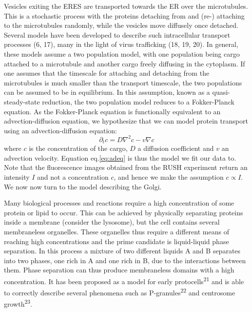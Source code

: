 \documentclass{Dissertate}
\begin{document}
Vesicles exiting the ERES are transported towards the ER over the
microtubules. This is a stochastic process with the proteins detaching
from and (re-) attaching to the microtubules randomly, while the
vesicles move diffusely once detached. Several models have been
developed to describe such intracellular transport processes (6, 17),
many in the light of virus trafficking (18, 19, 20). In general, these
models assume a two population model, with one population being cargo
attached to a microtubule and another cargo freely diffusing in the
cytoplasm. If one assumes that the timescale for attaching and detaching
from the microtubules is much smaller than the transport timescale, the
two populations can be assumed to be in equilibrium. In this assumption,
known as a quasi-steady-state reduction, the two population model
reduces to a Fokker-Planck equation. As the Fokker-Planck equation is
functionally equivalent to an advection-diffusion equation, we
hypothesize that we can model protein transport using an
advection-diffusion equation: \[
\partial_t c = D\nabla^2c-v\nabla c
\] where \(c\) is the concentration of the cargo, \(D\) a diffusion
coefficient and \(v\) an advection velocity. Equation eq.\ref{eq:adeq}
is thus the model we fit our data to. Note that the fluorescence images
obtained from the RUSH experiment return an intensity \(I\) and not a
concentration \(c\), and hence we make the assumption \(c \propto I\).
We now now turn to the model describing the Golgi.

Many biological processes and reactions require a high concentration of
some protein or lipid to occur. This can be achieved by physically
separating proteins inside a membrane (consider the lysosome), but the
cell contains several membraneless organelles. These organelles thus
require a different means of reaching high concentrations and the prime
candidate is liquid-liquid phase separation. In this process a mixture
of two different liquids A and B separates into two phases, one rich in
A and one rich in B, due to the interactions between them. Phase
separation can thus produce membraneless domains with a high
concentration. It has been proposed as a model for early
protocells\textsuperscript{21} and is able to correctly describe several
phenomena such as P-granules\textsuperscript{22} and centrosome
growth\textsuperscript{23}.
\end{document}
